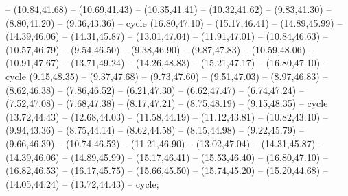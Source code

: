 {-- (10.84,41.68) -- (10.69,41.43) -- (10.35,41.41) -- (10.32,41.62) -- (9.83,41.30) -- (8.80,41.20) -- (9.36,43.36) -- cycle (16.80,47.10) -- (15.17,46.41) -- (14.89,45.99) -- (14.39,46.06) -- (14.31,45.87) -- (13.01,47.04) -- (11.91,47.01) -- (10.84,46.63) -- (10.57,46.79) -- (9.54,46.50) -- (9.38,46.90) -- (9.87,47.83) -- (10.59,48.06) -- (10.91,47.67) -- (13.71,49.24) -- (14.26,48.83) -- (15.21,47.17) -- (16.80,47.10) -- cycle (9.15,48.35) -- (9.37,47.68) -- (9.73,47.60) -- (9.51,47.03) -- (8.97,46.83) -- (8.62,46.38) -- (7.86,46.52) -- (6.21,47.30) -- (6.62,47.47) -- (6.74,47.24) -- (7.52,47.08) -- (7.68,47.38) -- (8.17,47.21) -- (8.75,48.19) -- (9.15,48.35) -- cycle (13.72,44.43) -- (12.68,44.03) -- (11.58,44.19) -- (11.12,43.81) -- (10.82,43.10) -- (9.94,43.36) -- (8.75,44.14) -- (8.62,44.58) -- (8.15,44.98) -- (9.22,45.79) -- (9.66,46.39) -- (10.74,46.52) -- (11.21,46.90) -- (13.02,47.04) -- (14.31,45.87) -- (14.39,46.06) -- (14.89,45.99) -- (15.17,46.41) -- (15.53,46.40) -- (16.80,47.10) -- (16.82,46.53) -- (16.17,45.75) -- (15.66,45.50) -- (15.74,45.20) -- (15.20,44.68) -- (14.05,44.24) -- (13.72,44.43) -- cycle;
}
